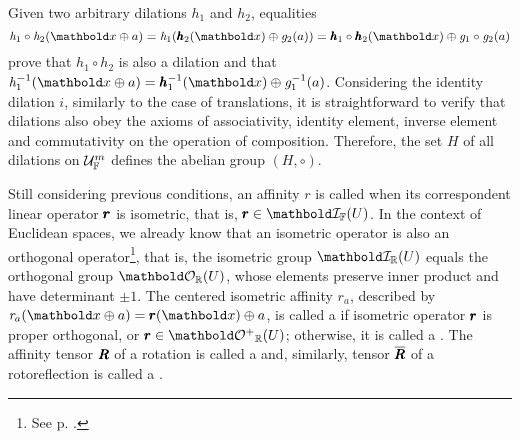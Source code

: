 \begin{figure}[!ht]
\centering
\begin{center}
\scalebox{.72}{}
\end{center}
\label{fg:dilation}
\end{figure}
Given two arbitrary dilations $\mathit{h}_1$ and $\mathit{h}_2$, equalities
\begin{equation*}
\fua{\mathit{h}_1\circ\mathit{h}_2}{\vto{x}\oplus a}=\fua{\mathit{h}_1}{\fua{\vtf{h}_2}{\vto{x}}\oplus\fua{\mathit{g}_2}{a}}=\fua{\vtf{h}_1\circ\vtf{h}_2}{\vto{x}}\oplus\fua{\mathit{g}_1\circ\mathit{g}_2}{a}
\end{equation*}
prove that $\mathit{h}_1\circ\mathit{h}_2$ is also a dilation and that $\fua{\mathit{h}^{-1}_1}{\vto{x}\oplus a}=\fua{\vtf{h}^{-1}_1}{\vto{x}}\oplus\fua{\mathit{g}^{-1}_1}{a}$. Considering the identity dilation $\mathit{i}$, similarly to the case of translations, it is straightforward to verify that dilations also obey the axioms of associativity, identity element, inverse element and commutativity on the operation of composition. Therefore, the set $H$ of all dilations on $\eamd{U}{F}{m}$ defines the abelian group $(H,\circ)$.


Still considering previous conditions, an affinity $\mathit{r}$ is called  when its correspondent linear operator $\vtf{r}$ is isometric, that is, $\vtf{r}\in\grc{I}{\cam{F}}{U}$. In the context of Euclidean spaces, we already know that an isometric operator is also an orthogonal operator\footnote{See p. \pageref{prg:IsometOrth}.}, that is, the isometric group $\grc{I}{\real}{U}$ equals the orthogonal group $\grc{O}{\real}{U}$, whose elements preserve inner product and have determinant $\pm 1$. The centered isometric affinity $\mathit{r}_a$, described by $\fua{\mathit{r}_a}{\vto{x}\oplus a}=\fua{\vtf{r}}{\vto{x}}\oplus a$, is called a  if isometric operator $\vtf{r}$ is proper orthogonal, or $\vtf{r}\in\grc{O^+}{\real}{U}$; otherwise, it is called a . The affinity tensor $\tnr{R}$ of a rotation is called a  and, similarly, tensor $\overline{\tnr{R}}$ of a rotoreflection is called a . 


